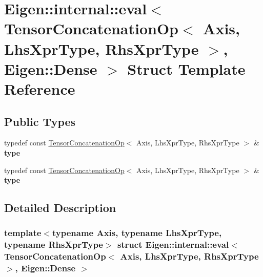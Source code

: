 \hypertarget{struct_eigen_1_1internal_1_1eval_3_01_tensor_concatenation_op_3_01_axis_00_01_lhs_xpr_type_00_014584aefce4bd43d98989ef5eac495878}{}\section{Eigen\+:\+:internal\+:\+:eval$<$ Tensor\+Concatenation\+Op$<$ Axis, Lhs\+Xpr\+Type, Rhs\+Xpr\+Type $>$, Eigen\+:\+:Dense $>$ Struct Template Reference}
\label{struct_eigen_1_1internal_1_1eval_3_01_tensor_concatenation_op_3_01_axis_00_01_lhs_xpr_type_00_014584aefce4bd43d98989ef5eac495878}
\subsection*{Public Types}
\begin{DoxyCompactItemize}
\item 
\mbox{\label{struct_eigen_1_1internal_1_1eval_3_01_tensor_concatenation_op_3_01_axis_00_01_lhs_xpr_type_00_014584aefce4bd43d98989ef5eac495878_ae77db5330f463a40ab67d3bdd4a7bb26}} 
typedef const \hyperlink{class_eigen_1_1_tensor_concatenation_op}{Tensor\+Concatenation\+Op}$<$ Axis, Lhs\+Xpr\+Type, Rhs\+Xpr\+Type $>$ \& {\bfseries type}
\item 
\mbox{\label{struct_eigen_1_1internal_1_1eval_3_01_tensor_concatenation_op_3_01_axis_00_01_lhs_xpr_type_00_014584aefce4bd43d98989ef5eac495878_ae77db5330f463a40ab67d3bdd4a7bb26}} 
typedef const \hyperlink{class_eigen_1_1_tensor_concatenation_op}{Tensor\+Concatenation\+Op}$<$ Axis, Lhs\+Xpr\+Type, Rhs\+Xpr\+Type $>$ \& {\bfseries type}
\end{DoxyCompactItemize}


\subsection{Detailed Description}
\subsubsection*{template$<$typename Axis, typename Lhs\+Xpr\+Type, typename Rhs\+Xpr\+Type$>$\newline
struct Eigen\+::internal\+::eval$<$ Tensor\+Concatenation\+Op$<$ Axis, Lhs\+Xpr\+Type, Rhs\+Xpr\+Type $>$, Eigen\+::\+Dense $>$}



